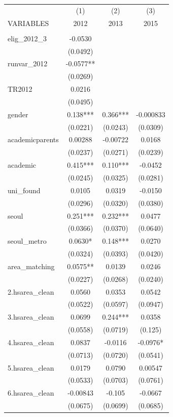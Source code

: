 \documentclass[]{article}
\begin{document}
\begin{tabular}{lccc} \hline
 & (1) & (2) & (3) \\
VARIABLES & 2012 & 2013 & 2015 \\ \hline
 &  &  &  \\
elig\_2012\_3 & -0.0530 &  &  \\
 & (0.0492) &  &  \\
runvar\_2012 & -0.0577** &  &  \\
 & (0.0269) &  &  \\
TR2012 & 0.0216 &  &  \\
 & (0.0495) &  &  \\
gender & 0.138*** & 0.366*** & -0.000833 \\
 & (0.0221) & (0.0243) & (0.0309) \\
academicparents & 0.00288 & -0.00722 & 0.0168 \\
 & (0.0237) & (0.0271) & (0.0239) \\
academic & 0.415*** & 0.110*** & -0.0452 \\
 & (0.0245) & (0.0325) & (0.0281) \\
uni\_found & 0.0105 & 0.0319 & -0.0150 \\
 & (0.0296) & (0.0320) & (0.0380) \\
seoul & 0.251*** & 0.232*** & 0.0477 \\
 & (0.0366) & (0.0370) & (0.0640) \\
seoul\_metro & 0.0630* & 0.148*** & 0.0270 \\
 & (0.0324) & (0.0393) & (0.0420) \\
area\_matching & 0.0575** & 0.0139 & 0.0246 \\
 & (0.0227) & (0.0268) & (0.0240) \\
2.hsarea\_clean & 0.0560 & 0.0353 & 0.0542 \\
 & (0.0522) & (0.0597) & (0.0947) \\
3.hsarea\_clean & 0.0699 & 0.244*** & 0.0358 \\
 & (0.0558) & (0.0719) & (0.125) \\
4.hsarea\_clean & 0.0837 & -0.0116 & -0.0976* \\
 & (0.0713) & (0.0720) & (0.0541) \\
5.hsarea\_clean & 0.0179 & 0.0790 & 0.00547 \\
 & (0.0533) & (0.0703) & (0.0761) \\
6.hsarea\_clean & -0.00843 & -0.105 & -0.0667 \\
 & (0.0675) & (0.0699) & (0.0685) \\

\end{tabular}
\end{document}
